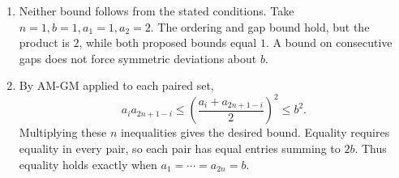 \begin{enumerate}
\item Neither bound follows from the stated conditions. Take $n=1,b=1,a_1=1,a_2=2$. The ordering and gap bound hold, but the product is $2$, while both proposed bounds equal $1$. A bound on consecutive gaps does not force symmetric deviations about $b$.
\item By AM-GM applied to each paired set,
\[
a_i a_{2n+1-i}\le\left(\dfrac{a_i+a_{2n+1-i}}{2}\right)^2\le b^2.
\]
Multiplying these $n$ inequalities gives the desired bound. Equality requires equality in every pair, so each pair has equal entries summing to $2b$. Thus equality holds exactly when $\boxed{a_1=\cdots=a_{2n}=b}$.
\end{enumerate}
